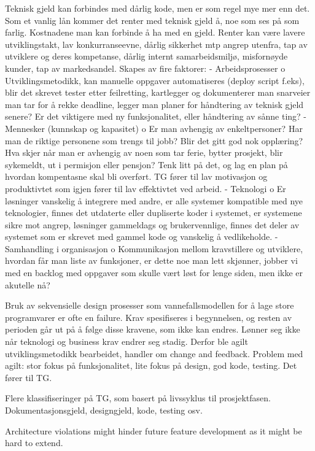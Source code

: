 Teknisk gjeld kan forbindes med dårlig kode, men er som regel mye mer enn det. Som et vanlig lån kommer det renter med teknisk gjeld å, noe som ses på som farlig. Kostnadene man kan forbinde å ha med en gjeld. Renter kan være lavere utviklingstakt, lav konkurranseevne, dårlig sikkerhet mtp angrep utenfra, tap av utviklere og deres kompetanse, dårlig internt samarbeidsmiljø, misfornøyde kunder, tap av markedsandel. 
Skapes av fire faktorer:
-	Arbeidsprosesser
o	Utviklingsmetodikk, kan manuelle oppgaver automatiseres (deploy script f.eks), blir det skrevet tester etter feilretting, kartlegger og dokumenterer man snarveier man tar for å rekke deadline, legger man planer for håndtering av teknisk gjeld senere? Er det viktigere med ny funksjonalitet, eller håndtering av sånne ting? 
-	Mennesker (kunnskap og kapasitet)
o	Er man avhengig av enkeltpersoner? Har man de riktige personene som trengs til jobb? Blir det gitt god nok opplæring? Hva skjer når man er avhengig av noen som tar ferie, bytter prosjekt, blir sykemeldt, ut i permisjon eller pensjon? Tenk litt på det, og lag en plan på hvordan kompentasne skal bli overført. TG fører til lav motivasjon og produktivtet som igjen fører til lav effektivtet ved arbeid.
-	Teknologi
o	Er løsninger vanskelig å integrere med andre, er alle systemer kompatible med nye teknologier, finnes det utdaterte eller dupliserte koder i systemet, er systemene sikre mot angrep, løsninger gammeldags og brukervennlige, finnes det deler av systemet som er skrevet med gammel kode og vanskelig å vedlikeholde.
-	Samhandling i organisasjon
o	Kommunikasjon mellom kravstillere og utviklere, hvordan får man liste av funksjoner, er dette noe man lett skjønner, jobber vi med en backlog med oppgaver som skulle vært løst for lenge siden, men ikke er akutelle nå? 


Bruk av sekvensielle design prosesser som vannefallsmodellen for å lage store programvarer er ofte en failure. Krav spesifiseres i begynnelsen, og resten av perioden går ut på å følge disse kravene, som ikke kan endres. Lønner seg ikke når teknologi og business krav endrer seg stadig. Derfor ble agilt utviklingsmetodikk bearbeidet, handler om change and feedback. Problem med agilt: stor fokus på funksjonalitet, lite fokus på design, god kode, testing. Det fører til TG. 

Flere klassifiseringer på TG, som basert på livssyklus til prosjektfasen. Dokumentasjonsgjeld, designgjeld, kode, testing osv. 

Architecture violations might hinder future feature development as it might be hard to extend. 

